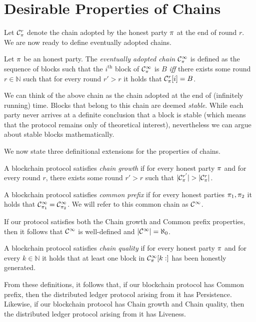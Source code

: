 \section{Desirable Properties of Chains}

Let $\mathcal{C}^r_\pi$ denote the chain adopted by the honest party $\pi$ at
the end of round $r$. We are now ready to define eventually adopted chains.

\begin{definition}
  Let $\pi$ be an honest party. The \emph{eventually adopted chain}
  $\mathcal{C}^\infty_\pi$ is defined as the sequence of blocks such that the
  $i^\text{th}$ block of $\mathcal{C}^\infty_\pi$ is $B$ \emph{iff} there exists
  some round $r \in \mathbb{N}$ such that for every round $r' > r$ it holds that
  $\mathcal{C}^r_\pi[i] = B$.
\end{definition}

We can think of the above chain as the chain adopted at the end of (infinitely
running) time. Blocks that belong to this chain are deemed \emph{stable}. While
each party never arrives at a definite conclusion that a block is stable
(which means that the protocol remains only of theoretical interest),
nevertheless we can argue about stable blocks mathematically.

We now state three definitional extensions for the properties of chains.

\begin{definition}
  A blockchain protocol satisfies \emph{chain growth} if for every honest
  party $\pi$ and for every round $r$, there exists some round $r' > r$ such
  that $|\mathcal{C}^{r'}_\pi| > |\mathcal{C}^r_\pi|$.
\end{definition}

\begin{definition}
  A blockchain protocol satisfies \emph{common prefix} if for every honest
  parties $\pi_1, \pi_2$ it holds that
  $\mathcal{C}^\infty_{\pi_1} = \mathcal{C}^\infty_{\pi_2}$. We will refer to this
  common chain as $\mathcal{C}^\infty$.
\end{definition}

If our protocol satisfies both the Chain growth and Common prefix properties,
then it follows that $\mathcal{C}^\infty$ is well-defined and
$|\mathcal{C}^\infty| = \aleph_0$.

\begin{definition}
  A blockchain protocol satisfies \emph{chain quality} if for every honest party
  $\pi$ and for every $k \in \mathbb{N}$ it holds that at least one block in
  $\mathcal{C}^\infty_\pi[k:]$ has been honestly generated.
\end{definition}

From these definitions, it follows that, if our blockchain protocol has Common
prefix, then the distributed ledger protocol arising from it has Persistence.
Likewise, if our blockchain protocol has Chain growth and Chain quality, then
the distributed ledger protocol arising from it has Liveness.
